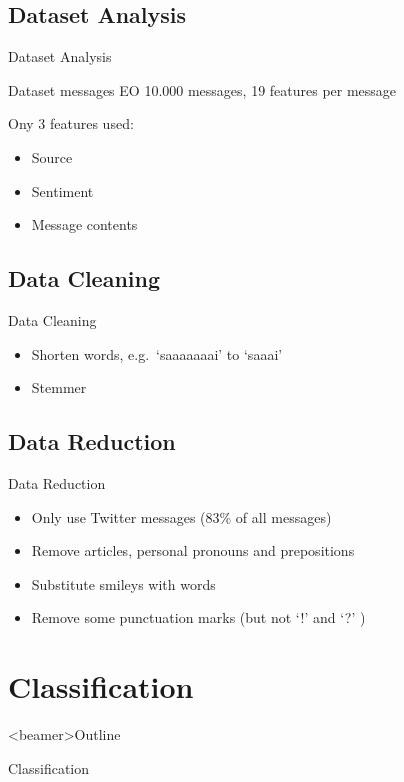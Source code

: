 \documentclass{beamer}
\begin{document}
\subsection{Dataset Analysis}
\begin{frame}{Dataset Analysis}
\begin{block}{Dataset messages EO}
10.000 messages, 19 features per message
\end{block}
Ony 3 features used: \\
\begin{itemize}
\item Source
\item Sentiment
\item Message contents
\end{itemize}
\end{frame}


\subsection{Data Cleaning}
\begin{frame}{Data Cleaning}
\begin{itemize}
\item Shorten words, e.g.\ `saaaaaaai' to `saaai'
\item Stemmer
\end{itemize}
\end{frame}

\subsection{Data Reduction}
\begin{frame}{Data Reduction}
\begin{itemize}
\item Only use Twitter messages (83\% of all messages)
\item Remove articles, personal pronouns and prepositions
\item Substitute smileys with words
\item Remove some punctuation marks (but not `!' and `?' )
\end{itemize}
\end{frame}

\section{Classification}
\begin{frame}<beamer>{Outline}
    \setcounter{tocdepth}{2}
    \tableofcontents[
    currentsubsection, 
    hideothersubsections, 
    sectionstyle=show/hide] 
  \end{frame}
\begin{frame}{Classification}
\end{frame}
\end{document}
